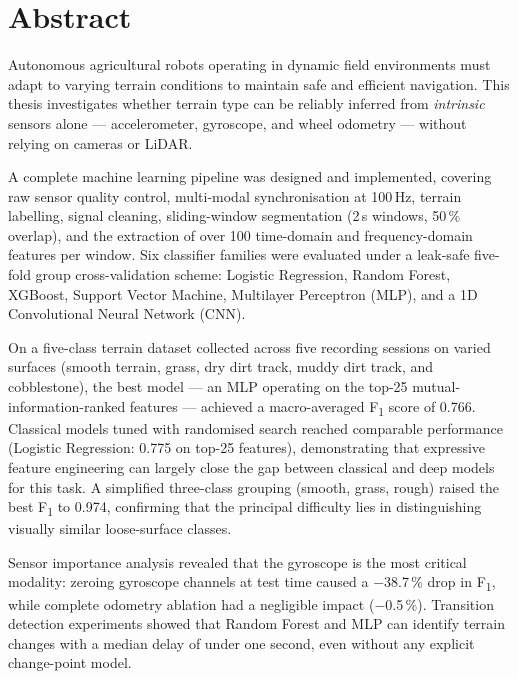 \section*{Abstract}

Autonomous agricultural robots operating in dynamic field environments must adapt to
varying terrain conditions to maintain safe and efficient navigation.
This thesis investigates whether terrain type can be reliably inferred from
\emph{intrinsic} sensors alone — accelerometer, gyroscope, and wheel odometry —
without relying on cameras or LiDAR.

A complete machine learning pipeline was designed and implemented, covering raw sensor
quality control, multi-modal synchronisation at 100\,Hz, terrain labelling, signal
cleaning, sliding-window segmentation (2\,s windows, 50\,\% overlap), and the
extraction of over 100 time-domain and frequency-domain features per window.
Six classifier families were evaluated under a leak-safe five-fold group
cross-validation scheme: Logistic Regression, Random Forest, XGBoost, Support Vector
Machine, Multilayer Perceptron (MLP), and a 1D Convolutional Neural Network (CNN).

On a five-class terrain dataset collected across five recording sessions on varied
surfaces (smooth terrain, grass, dry dirt track, muddy dirt track, and cobblestone),
the best model — an MLP operating on the top-25 mutual-information-ranked features —
achieved a macro-averaged F\textsubscript{1} score of 0.766.
Classical models tuned with randomised search reached comparable performance
(Logistic Regression: 0.775 on top-25 features), demonstrating that
expressive feature engineering can largely close the gap between classical and
deep models for this task.
A simplified three-class grouping (smooth, grass, rough) raised the best F\textsubscript{1}
to 0.974, confirming that the principal difficulty lies in distinguishing
visually similar loose-surface classes.

Sensor importance analysis revealed that the gyroscope is the most critical modality:
zeroing gyroscope channels at test time caused a $-$38.7\,\% drop in F\textsubscript{1},
while complete odometry ablation had a negligible impact ($-$0.5\,\%).
Transition detection experiments showed that Random Forest and MLP can identify
terrain changes with a median delay of under one second, even without any explicit
change-point model.


